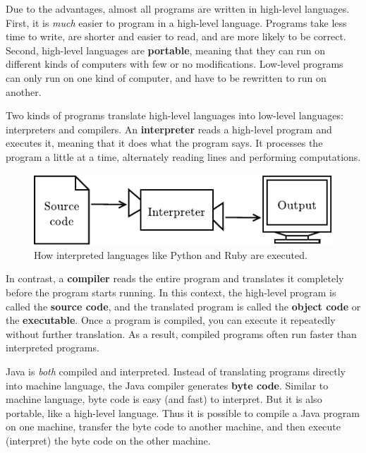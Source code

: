 \documentclass[12pt]{book}
\theoremstyle{exercise}
\begin{document}

Due to the advantages, almost all programs are written in high-level languages.
First, it is {\em much} easier to program in a high-level language.
Programs take less time to write, are shorter and easier to read, and are more likely to be correct.
Second, high-level languages are {\bf portable}, meaning that they can run on different kinds of computers with few or no modifications.
Low-level programs can only run on one kind of computer, and have to be rewritten to run on another.


Two kinds of programs translate high-level languages into low-level languages: interpreters and compilers.
An {\bf interpreter} reads a high-level program and executes it, meaning that it does what the program says.
It processes the program a little at a time, alternately reading lines and performing computations.

\begin{figure}[!h]
\begin{center}
\includegraphics{figs/interpreter.pdf}
\caption{How interpreted languages like Python and Ruby are executed.}
\end{center}
\end{figure}


In contrast, a {\bf compiler} reads the entire program and translates it completely before the program starts running.
In this context, the high-level program is called the {\bf source code}, and the translated program is called the {\bf object code} or the {\bf executable}.
Once a program is compiled, you can execute it repeatedly without further translation.
As a result, compiled programs often run faster than interpreted programs.


Java is {\em both} compiled and interpreted.
Instead of translating programs directly into machine language, the Java compiler generates {\bf byte code}.
Similar to machine language, byte code is easy (and fast) to interpret.
But it is also portable, like a high-level language.
Thus it is possible to compile a Java program on one machine, transfer the byte code to another machine, and then execute (interpret) the byte code on the other machine.
\end{document}
